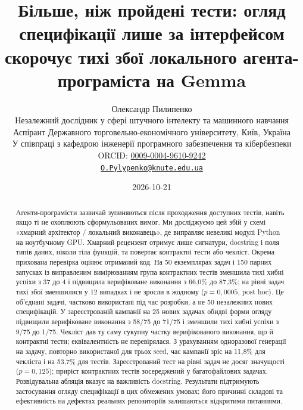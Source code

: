 \documentclass[11pt]{article}
\begin{document}

\title{Більше, ніж пройдені тести: огляд специфікації лише за інтерфейсом скорочує тихі збої локального агента-програміста на Gemma}
\author{Олександр Пилипенко\\[2pt]\small Незалежний дослідник у сфері штучного інтелекту та машинного навчання\\ \small Аспірант Державного торговельно-економічного університету, Київ, Україна\\ \small У співпраці з кафедрою інженерії програмного забезпечення та кібербезпеки\\[2pt]
\small ORCID: \href{https://orcid.org/0009-0004-9610-9242}{0009-0004-9610-9242}\\ \small\href{mailto:O.Pylypenko@knute.edu.ua}{\texttt{O.Pylypenko@knute.edu.ua}}}
\date{2026-10-21}
\maketitle

\begin{abstract}
\noindent
Агенти-програмісти зазвичай зупиняються після проходження доступних тестів, навіть якщо ті не охоплюють сформульованих вимог. Ми досліджуємо цей збій у схемі «хмарний архітектор / локальний виконавець», де  виправляє невеликі модулі Python на ноутбучному GPU. Хмарний рецензент отримує лише сигнатури, docstring і поля типів даних, ніколи тіла функцій, та повертає контрактні тести або чекліст. Окрема прихована перевірка оцінює отриманий код. На 50 екземплярах задач і 150 парних запусках із виправленим вимірюванням група контрактних тестів зменшила тихі хибні успіхи з 37 до 4 і підвищила верифіковане виконання з 66{,}0\% до 87{,}3\%; на рівні задач тихі збої зменшилися у 12 випадках і не зросли в жодному ($p=0{,}0005$, post hoc). Це об'єднані задачі, частково використані під час розробки, а не 50 незалежних нових специфікацій. У зареєстрованій кампанії на 25 нових задачах обидві форми огляду підвищили верифіковане виконання з 58/75 до 71/75 і зменшили тихі хибні успіхи з 9/75 до 1/75. Чекліст дав ту саму сукупну частку верифікованого виконання, що й контрактні тести; еквівалентність не перевірялася. З урахуванням одноразової генерації на задачу, повторно використаної для трьох seed, час кампанії зріс на 11{,}8\% для чекліста і на 53{,}7\% для тестів. Зареєстрований тест на рівні задач не досяг значущості ($p=0{,}125$); приріст контрактних тестів зосереджений у багатофайлових задачах. Розвідувальна абляція вказує на важливість docstring. Результати підтримують застосування огляду специфікації в цих обмежених умовах; його причинні складові та ефективність на дефектах реальних репозиторіїв залишаються відкритими питаннями.
\end{abstract}
\end{document}
